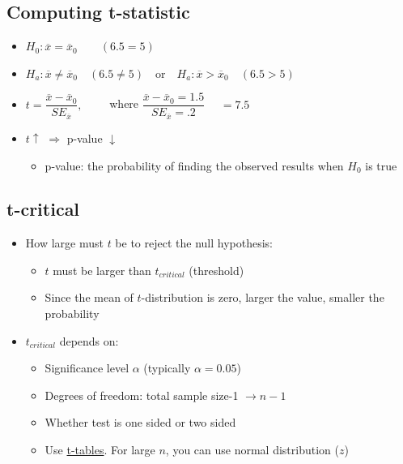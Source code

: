 \documentclass[10pt,article]{article}
\begin{document}
\subsection{Computing t-statistic}
\label{sec:org1b2d3b5}
\begin{itemize}
\item \(H_0: \overline{x} = \overline{x}_0 \qquad (6.5 = 5)\)
\item \( H_a: \overline{x} \ne \overline{x}_0 \quad (6.5 \ne 5) \quad
  \text{or} \quad H_a: \overline{x}>\overline{x}_0 \quad (6.5 > 5) \)

\item \(t=\dfrac{\overline{x} - \overline{x}_0}{SE_{\overline{x}}}, \qquad\)
 where \(\dfrac{\overline{x} - \overline{x}_0 = 1.5}{SE_{\overline{x}} = .2} \)  \(  \quad = 7.5 \)
\end{itemize}

\begin{itemize}
\item \(t \uparrow\) \(\Rightarrow\)  p-value \( \downarrow \)

\begin{itemize}
\item p-value: the probability of finding the observed results when \(H_{0}\) is true
\end{itemize}
\end{itemize}

\subsection{t-critical}
\label{sec:org1eb363a}
\begin{itemize}
\item How large must \(t\) be to reject the null hypothesis:
\begin{itemize}
\item \(t\) must be larger than \(t_{critical}\) (threshold)
\item Since the mean of \(t\)-distribution is zero, larger the value, smaller
the probability
\end{itemize}
\end{itemize}

\begin{itemize}
\item \(t_{critical}\) depends on:
\begin{itemize}
\item Significance level \(\alpha\) (typically \(\alpha=0.05\))
\item Degrees of freedom: total sample size-1 \(\rightarrow n-1\)
\item Whether test is one sided or two sided
\item Use \uline{t-tables}. For large \(n\), you can use normal distribution (\(z\))
\end{itemize}
\end{itemize}
\end{document}
